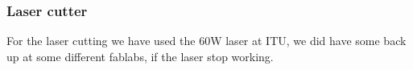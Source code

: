 \subsubsection{Laser cutter}
For the laser cutting we have used the 60W laser at ITU, we did have some back up at some different fablabs, if the laser stop working.


